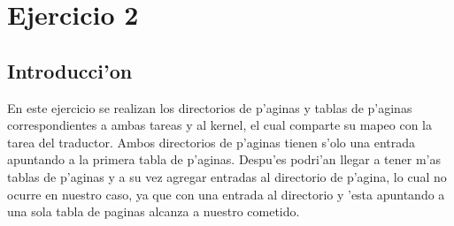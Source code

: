 \documentclass[11pt]{article}
\begin{document}
\section{Ejercicio 2}
\subsection{Introducci'on} En este ejercicio se realizan los directorios de p'aginas y tablas de p'aginas correspondientes a ambas tareas y al kernel, el cual comparte su mapeo con la tarea del traductor. Ambos directorios de p'aginas tienen s'olo una entrada apuntando a la primera tabla de p'aginas. Despu'es podri'an llegar a tener m'as tablas de p'aginas y a su vez agregar entradas al directorio de p'agina, lo cual no ocurre en nuestro caso, ya que con una entrada al directorio y 'esta apuntando a una sola tabla de paginas alcanza a nuestro cometido.
\end{document}
